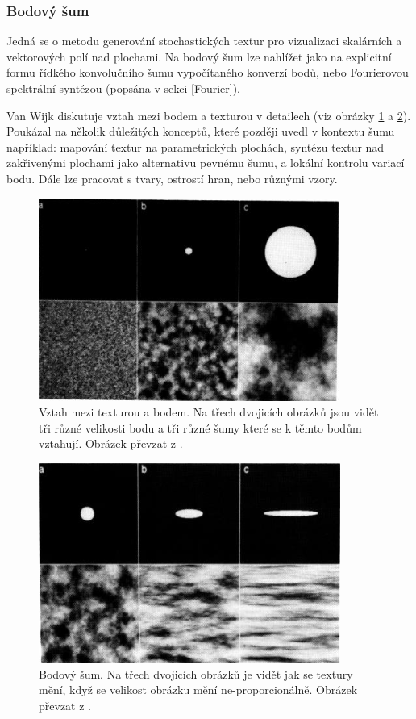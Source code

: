 \subsubsection{Bodový šum}
\label{SpotNoise}
Jedná se o metodu generování stochastických textur pro vizualizaci skalárních a vektorových polí nad plochami. Na bodový šum lze nahlížet jako na explicitní formu řídkého konvolučního šumu vypočítaného konverzí bodů, nebo Fourierovou spektrální syntézou (popsána v sekci \ref{Fourier}).

Van Wijk \cite{Wijk91} diskutuje vztah mezi bodem a texturou v detailech (viz obrázky \ref{fig:SpotNoise} a \ref{fig:SpotNoiseNonProportional}). Poukázal na několik důležitých konceptů, které později uvedl v kontextu šumu například: mapování textur na parametrických plochách, syntézu textur nad zakřivenými plochami jako alternativu pevnému šumu, a lokální kontrolu variací bodu. Dále lze pracovat s tvary, ostrostí hran, nebo různými vzory.

\begin{figure}[H]
	\centering
	\includegraphics[scale=0.7]{obrazky-figures/SpotNoiseSize.png}
	\caption{Vztah mezi texturou a bodem. Na třech dvojicích obrázků jsou vidět tři různé velikosti bodu a tři různé šumy které se k těmto bodům vztahují. Obrázek převzat z \cite{Wijk91}.}
	\label{fig:SpotNoise}
\end{figure}
\begin{figure}[H]
	\centering
	\includegraphics[scale=0.7]{obrazky-figures/SpotNoiseNonProportional.png}
	\caption{Bodový šum. Na třech dvojicích obrázků je vidět jak se textury mění, když se velikost obrázku mění ne-proporcionálně. Obrázek převzat z \cite{Wijk91}.}
	\label{fig:SpotNoiseNonProportional}
\end{figure}

